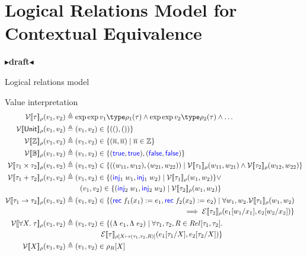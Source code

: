 \documentclass[twoside,11pt,openright]{report}
\theoremstyle{definition}
\newcommand{\Keyword}[1]{{\color{blue} \mathsf{#1}}}
\newcommand{\var}{x}
\newcommand{\expr}{e}
\newcommand{\val}{v}
\newcommand{\valB}{w}
\newcommand{\TT}{()}
\newcommand{\Num}[1]{\overline{#1}}
\newcommand{\True}{\Keyword{true}}
\newcommand{\False}{\Keyword{false}}
\newcommand{\Inj}[1]{\Keyword{inj}_{#1}\;}
\newcommand{\Tvar}{X}
\newcommand{\Tlam}{\Lambda\;}
\newcommand{\subst}[3]{#1{\left[#3 \middle/ #2 \right]}}
\newcommand{\Tunit}{\mathsf{Unit}}
\newcommand{\Tint}{\mathbb{Z}}
\newcommand{\Tbool}{\mathbb{B}}
\newcommand{\Tprod}[2]{#1 \times #2}
\newcommand{\Tsum}[2]{#1 + #2}
\newcommand{\Tfunc}[2]{#1 \rightarrow #2}
\newcommand{\Tall}[2]{\forall #1.\; #2}
\newcommand{\typ}{\tau}
\newcommand{\empvenv}{\bullet}
\newcommand{\emptenv}{\bullet}
\def\envs#1#2\exp#3\type#4{#1 \; | \; #2 \; \vdash #3 : #4}
\newcommand{\ValInp}[2]{\mathcal{V} \llbracket #1 \rrbracket_{#2}}
\newcommand{\ValInpGen}[2]{\ValInp{#1}{#2}(\val_1, \val_2)}
\newcommand{\ExpInp}[2]{\mathcal{E} \llbracket #1 \rrbracket_{#2}}
\newcommand{\map}[2]{#1 \mapsto #2}
\newcommand{\todo}[1]{{\color[rgb]{.5,0,0}\textbf{$\blacktriangleright$#1$\blacktriangleleft$}}}
\begin{document}

\chapter{Logical Relations Model for Contextual Equivalence}
\label{ch:LR}

\todo{draft}

Logical relations model

Value interpretation
\begin{align*}
  \ValInpGen{\typ}{\rho}    &\triangleq \envs \emptenv \empvenv \exp \val_1 \type \rho_1(\typ) \land \envs \emptenv \empvenv \exp \val_2 \type \rho_2(\typ) \land \dots\\
  \ValInpGen{\Tunit}{\rho}  &\triangleq (\val_1, \val_2) \in \{(\TT, \TT)\}\\
  \ValInpGen{\Tint}{\rho}   &\triangleq (\val_1, \val_2) \in \{(\Num{n}, \Num{n}) \mid \Num{n} \in \Tint\}\\
  \ValInpGen{\Tbool}{\rho}  &\triangleq (\val_1, \val_2) \in \{(\True, \True), (\False, \False)\}\\
  \ValInpGen{\Tprod{\typ_1}{\typ_2}}{\rho}  &\triangleq (\val_1, \val_2) \in \{((\valB_{11}, \valB_{12}), (\valB_{21}, \valB_{22})) \mid \ValInp{\typ_1}{\rho}(\valB_{11}, \valB_{21}) \land \ValInp{\typ_2}{\rho}(\valB_{12}, \valB_{22})\}\\
  \ValInpGen{\Tsum{\typ_1}{\typ_2}}{\rho}   &\triangleq 
  \begin{aligned}[t]
    (\val_1, \val_2) \in \{(\Inj{1} \valB_1, \Inj{1} \valB_2) \mid \ValInp{\typ_1}{\rho}(\valB_1, \valB_2)\} \lor \\
    (\val_1, \val_2) \in \{(\Inj{2} \valB_1, \Inj{2} \valB_2) \mid \ValInp{\typ_2}{\rho}(\valB_1, \valB_2)\}
  \end{aligned}\\
  \ValInpGen{\Tfunc{\typ_1}{\typ_2}}{\rho}  &\triangleq 
  \begin{aligned}[t]
    (\val_1, \val_2) \in \{(\Rec f_1 \var_1 := \expr_1, \Rec f_2 \var_2 := \expr_2) \mid \forall \valB_1, \valB_2 . \ValInp{\typ_1}{\rho}(\valB_{1}, \valB_{2})\\
    \implies \ExpInp{\typ_2}{\rho}(\subst{\expr_1}{\var_1}{\valB_1}, \subst{\expr_2}{\var_2}{\valB_2})\}
  \end{aligned}\\
  \ValInpGen{\Tall{\Tvar}{\typ}}{\rho}  &\triangleq 
  \begin{aligned}[t]
    (\val_1, \val_2) \in \{(\Tlam \expr_1, \Tlam \expr_2) \mid \forall \typ_1, \typ_2, R \in Rel[\typ_1, \typ_2] .\\
    \ExpInp{\typ}{\rho[\map{\Tvar}{(\typ_1, \typ_2, R)}]}(\subst{\expr_1}{\Tvar}{\typ_1}, \subst{\expr_2}{\Tvar}{\typ_2})\}
  \end{aligned}\\
  \ValInpGen{\Tvar}{\rho} &\triangleq (\val_1, \val_2) \in \rho_R[\Tvar]\\
\end{align*}
\end{document}
